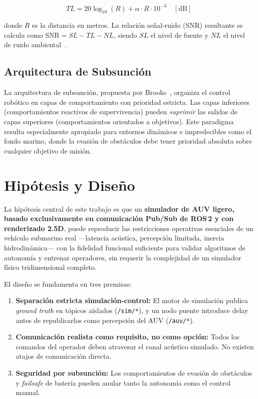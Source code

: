 \documentclass[10pt,twocolumn,letterpaper]{article}
\begin{document}
\begin{equation}
TL = 20 \log_{10}(R) + \alpha \cdot R \cdot 10^{-3} \quad [\text{dB}]
\label{eq:tl}
\end{equation}

donde $R$ es la distancia en metros. La relación señal-ruido (SNR) resultante se calcula como $\text{SNR} = SL - TL - NL$, siendo $SL$ el nivel de fuente y $NL$ el nivel de ruido ambiental~\cite{urick1983}.

\subsection{Arquitectura de Subsunción}

La arquitectura de subsunción, propuesta por Brooks~\cite{brooks1986}, organiza el control robótico en capas de comportamiento con prioridad estricta. Las capas inferiores (comportamientos reactivos de supervivencia) pueden \textit{suprimir} las salidas de capas superiores (comportamientos orientados a objetivos). Este paradigma resulta especialmente apropiado para entornos dinámicos e impredecibles como el fondo marino, donde la evasión de obstáculos debe tener prioridad absoluta sobre cualquier objetivo de misión.

\section{Hipótesis y Diseño}
\label{sec:hipotesis}

La hipótesis central de este trabajo es que un \textbf{simulador de AUV ligero, basado exclusivamente en comunicación Pub/Sub de ROS\,2 y con renderizado 2.5D}, puede reproducir las restricciones operativas esenciales de un vehículo submarino real ---latencia acústica, percepción limitada, inercia hidrodinámica--- con la fidelidad funcional suficiente para validar algoritmos de autonomía y entrenar operadores, sin requerir la complejidad de un simulador físico tridimensional completo.

El diseño se fundamenta en tres premisas:

\begin{enumerate}[leftmargin=*,itemsep=2pt]
    \item \textbf{Separación estricta simulación-control:} El motor de simulación publica \textit{ground truth} en tópicos aislados (\texttt{/sim/*}), y un nodo puente introduce delay antes de republicarlos como percepción del AUV (\texttt{/auv/*}).
    \item \textbf{Comunicación realista como requisito, no como opción:} Todos los comandos del operador deben atravesar el canal acústico simulado. No existen atajos de comunicación directa.
    \item \textbf{Seguridad por subsunción:} Los comportamientos de evasión de obstáculos y \textit{failsafe} de batería pueden anular tanto la autonomía como el control manual.
\end{enumerate}
\end{document}
